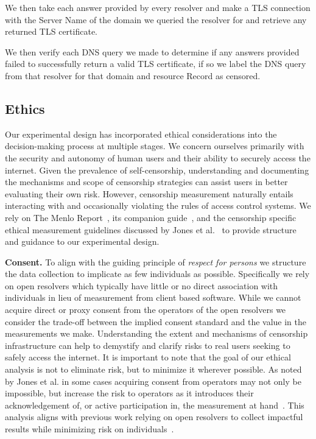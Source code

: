 We then take each answer provided by every resolver and make a TLS connection
with the Server Name of the domain we queried the resolver for and retrieve any
returned TLS certificate.

We then verify each DNS query we made to determine if any answers provided
failed to successfully return a valid TLS certificate, if so we label the DNS
query from that resolver for that domain and resource Record as censored.

\subsection{Ethics}\label{sec:methodology:ethics}
Our experimental design has incorporated ethical
considerations into the decision-making process at multiple stages. We concern
ourselves primarily with the security and autonomy of human users and their
ability to securely access the internet. Given the prevalence of self-censorship,
understanding and documenting the mechanisms and scope of censorship
strategies can assist users in better evaluating their own risk. However,
censorship measurement naturally entails interacting with and occasionally
violating the rules of access control systems. We rely on The Menlo
Report~\cite{menlo}, its companion guide~\cite{menlo-companion}, and the
censorship specific ethical measurement guidelines discussed by
Jones et al.~\cite{jones2015ethical} to provide structure and guidance to our
experimental design.


\textbf{Consent.}
To align with the guiding principle of \textit{respect for persons} we structure the
data collection to implicate as few individuals as possible. Specifically we rely
on open resolvers which typically have little or no direct association with
individuals in lieu of measurement from client based software.
While we cannot acquire direct or proxy consent from the operators of the open
resolvers we consider the trade-off between the implied consent standard and the
value in the measurements we make. Understanding the extent and mechanisms of
censorship infrastructure can help to demystify and clarify risks to real users
seeking to safely access the internet. It is important to note that the
goal of our ethical analysis is not to eliminate risk, but to minimize it wherever possible. As noted by
Jones et al. in some cases acquiring consent from operators may not only be
impossible, but increase the risk to operators as it introduces their
acknowledgement of, or active participation in, the measurement at
hand~\cite{jones2015ethical}. This analysis aligns with previous work relying
on open resolvers to collect impactful results while minimizing risk on
individuals~\cite{pearce2017global,scott2016satellite,sundara2020censored}.

